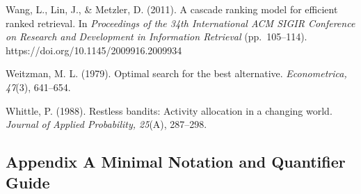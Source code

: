 \documentclass[
  11pt]{article}
\begin{document}
Wang, L., Lin, J., \& Metzler, D. (2011). A cascade ranking model for
efficient ranked retrieval. In \emph{Proceedings of the 34th
International ACM SIGIR Conference on Research and Development in
Information Retrieval} (pp.~105--114).
https://doi.org/10.1145/2009916.2009934

Weitzman, M. L. (1979). Optimal search for the best alternative.
\emph{Econometrica, 47}(3), 641--654.

Whittle, P. (1988). Restless bandits: Activity allocation in a changing
world. \emph{Journal of Applied Probability, 25}(A), 287--298.

\subsection{Appendix A Minimal Notation and Quantifier
Guide}\label{appendix-a-minimal-notation-and-quantifier-guide}
\end{document}
